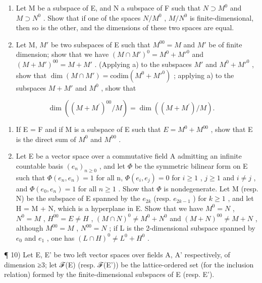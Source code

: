 \begin{enumerate}
\def\labelenumi{\alph{enumi})}
\item
  Let M be a subspace of E, and N a subspace of F such that \(N \supset M^{0}\) and \(M \supset N^{0}\) . Show that if one of the spaces \(N/M^{0}\) , \(M/N^{0}\) is finite-dimensional, then so is the other, and the dimensions of these two spaces are equal.
\item
  Let M, \(M'\) be two subspaces of E such that \(M^{00} = M\) and \(M'\) be of finite dimension; show that we have \((M \cap M')^{0} = M^{0} + M'^{0}\) and \((M + M')^{00} = M + M'\) . (Applying a) to the subspaces \(M'\) and \(M^{0} + M'^{0}\) , show that \(\dim(M \cap M') = \text{codim}(M^{0} + M'^{0})\) ; applying a) to the subspaces \(M + M'\) and \(M^{0}\) , show that
\end{enumerate}

\[
\dim ((M + M ^ {\prime}) ^ {0 0} / M) = \dim ((M + M ^ {\prime}) / M).
\]

\begin{enumerate}
\def\labelenumi{\alph{enumi})}
\setcounter{enumi}{2}
\item
  If E = F and if M is a subspace of E such that \(E = M^{0} + M^{00}\) , show that E is the direct sum of \(M^{0}\) and \(M^{00}\) .
\item
  Let E be a vector space over a commutative field A admitting an infinite countable basis \((e_{n})_{n\geqslant0}\) , and let \(\Phi\) be the symmetric bilinear form on E such that \(\Phi(e_{n}, e_{n}) = 1\) for all n, \(\Phi(e_{i}, e_{j}) = 0\) for \(i \geqslant 1\) , \(j \geqslant 1\) and \(i \neq j\) , and \(\Phi(e_{0}, e_{n}) = 1\) for all \(n \geqslant 1\) . Show that \(\Phi\) is nondegenerate. Let M (resp. N) be the subspace of E spanned by the \(e_{2k}\) (resp. \(e_{2k-1}\) ) for \(k \geqslant 1\) , and let H = M + N, which is a hyperplane in E. Show that we have \(M^{0} = N\) , \(N^{0} = M\) , \(H^{00} = E \neq H\) , \((M \cap N)^{0} \neq M^{0} + N^{0}\) and \((M + N)^{00} \neq M + N\) , although \(M^{00} = M\) , \(N^{00} = N\) ; if L is the 2-dimensional subspace spanned by \(e_{0}\) and \(e_{1}\) , one has \((L \cap H)^{0} \neq L^{0} + H^{0}\) .
\end{enumerate}

¶ 10) Let E, E' be two left vector spaces over fields A, A' respectively, of dimension ≥3; let ℱ(E) (resp. ℱ(E')) be the lattice-ordered set (for the inclusion relation) formed by the finite-dimensional subspaces of E (resp. E').

